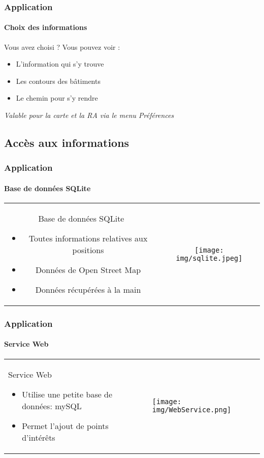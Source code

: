 \begin{frame}
\frametitle{Application}
\framesubtitle{Choix des informations}

Vous avez choisi ? Vous pouvez voir :

\begin{itemize}
	\item L'information qui s'y trouve
	\item Les contours des bâtiments
	\item Le chemin pour s'y rendre
\end{itemize}

 \textit{Valable pour la carte et la RA via le menu Préférences}
\end{frame}

\subsection{Accès aux informations}

\begin{frame}
\frametitle{Application}
\framesubtitle{Base de données SQLite}

\begin{center}
\begin{tabular}{cc}
	\begin{minipage}{6cm}
		Base de données SQLite
		\begin{itemize}
			\item Toutes informations relatives aux positions
			\item Données de Open Street Map
			\item Données récupérées à la main
		\end{itemize}
	\end{minipage}  &		
	\begin{minipage}{6cm}
		\texttt{[image: img/sqlite.jpeg]} 
	\end{minipage}\\
\end{tabular}
\end{center}
\end{frame}

\begin{frame}
\frametitle{Application}
\framesubtitle{Service Web}

\begin{center}
\begin{tabular}{ll}
	\begin{minipage}{5cm}

		Service Web
		\begin{itemize}
			\item Utilise une petite base de données: mySQL
			\item Permet l'ajout de points d'intérêts
		\end{itemize}
	\end{minipage}  &		
	\begin{minipage}{7cm}
		\texttt{[image: img/WebService.png]} 
	\end{minipage}\\
\end{tabular}
\end{center}

\end{frame}

